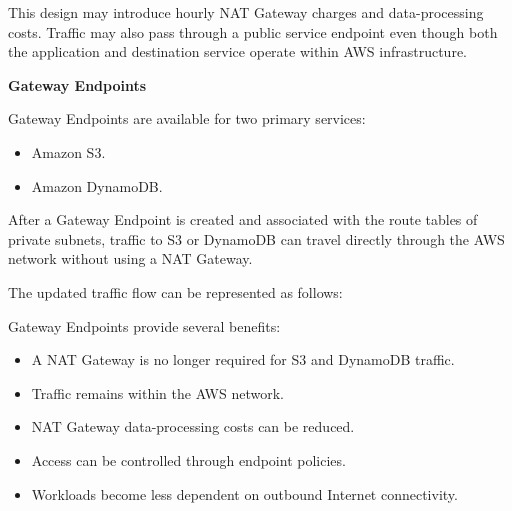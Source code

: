 \begin{Shaded}
\begin{Highlighting}[]
\NormalTok{      |}
\NormalTok{      |}
\end{Highlighting}
\end{Shaded}

This design may introduce hourly NAT Gateway charges and data-processing
costs. Traffic may also pass through a public service endpoint even
though both the application and destination service operate within AWS
infrastructure.

\vspace{0.5em}\noindent\textbf{Gateway Endpoints}\par

Gateway Endpoints are available for two primary services:

\begin{itemize}
\tightlist
\item
  Amazon S3.
\item
  Amazon DynamoDB.
\end{itemize}

After a Gateway Endpoint is created and associated with the route tables
of private subnets, traffic to S3 or DynamoDB can travel directly
through the AWS network without using a NAT Gateway.

The updated traffic flow can be represented as follows:

\begin{Shaded}
\begin{Highlighting}[]
\NormalTok{      |}
\NormalTok{      |}
\end{Highlighting}
\end{Shaded}

Gateway Endpoints provide several benefits:

\begin{itemize}
\tightlist
\item
  A NAT Gateway is no longer required for S3 and DynamoDB traffic.
\item
  Traffic remains within the AWS network.
\item
  NAT Gateway data-processing costs can be reduced.
\item
  Access can be controlled through endpoint policies.
\item
  Workloads become less dependent on outbound Internet connectivity.
\end{itemize}

